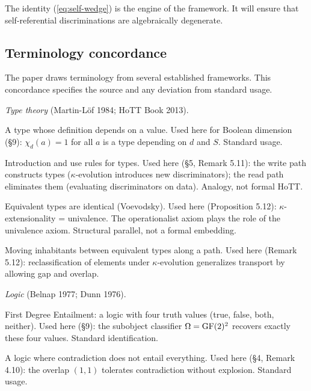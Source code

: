 The identity (\ref{eq:self-wedge}) is the engine of the framework.
It will ensure that self-referential discriminations are algebraically
degenerate.


\subsection{Terminology concordance}
\label{sec:concordance}

The paper draws terminology from several established
frameworks. This concordance specifies the source and
any deviation from standard usage.

\emph{Type theory} (Martin-L\"{o}f 1984; HoTT Book 2013).
\begin{description}[nosep,leftmargin=1.5cm]
  \item[Dependent type] A type whose definition depends on
    a value. Used here for Boolean dimension (\S9):
    $\chi_d(a) = 1$ for all $a$ is a type depending on $d$
    and $S$. Standard usage.
  \item[Type construction / elimination] Introduction and
    use rules for types. Used here (\S5, Remark 5.11):
    the write path constructs types ($\kappa$-evolution
    introduces new discriminators); the read path
    eliminates them (evaluating discriminators on data).
    Analogy, not formal HoTT.
  \item[Univalence] Equivalent types are identical
    (Voevodsky). Used here (Proposition 5.12):
    $\kappa$-extensionality = univalence. The
    operationalist axiom plays the role of the univalence
    axiom. Structural parallel, not a formal embedding.
  \item[Transport] Moving inhabitants between equivalent
    types along a path. Used here (Remark 5.12):
    reclassification of elements under $\kappa$-evolution
    generalizes transport by allowing gap and overlap.
\end{description}

\emph{Logic} (Belnap 1977; Dunn 1976).
\begin{description}[nosep,leftmargin=1.5cm]
  \item[Belnap's four-valued logic / FDE] First Degree
    Entailment: a logic with four truth values (true,
    false, both, neither). Used here (\S9): the subobject
    classifier $\Omega = \operatorname{GF}(2)^2$ recovers exactly these
    four values. Standard identification.
  \item[Paraconsistent] A logic where contradiction does
    not entail everything. Used here (\S4, Remark 4.10):
    the overlap $(1,1)$ tolerates contradiction without
    explosion. Standard usage.
\end{description}

